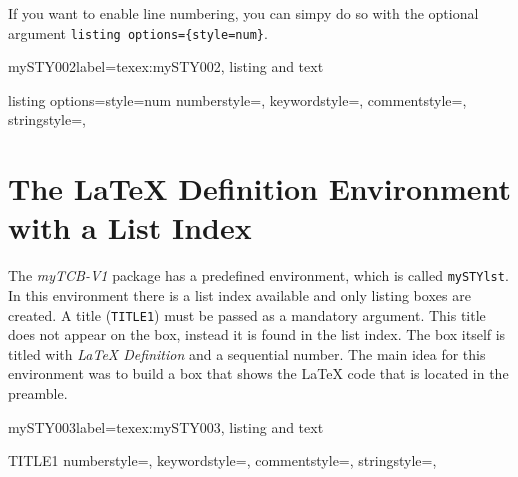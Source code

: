 \documentclass[]{myHOWTO-V001}
\begin{document}
If you want to enable line numbering, you can simpy do so with the optional argument \verb|listing options={style=num}|.

\begin{myTEXEXdoclst}{mySTY002}{label={texex:mySTY002}, listing and text}
\begin{mySTY}{listing options={style=num}}
{
	numberstyle={\scriptsize\ttfamily},
	keywordstyle={\scriptsize\ttfamily},
	commentstyle={\scriptsize\ttfamily},
	stringstyle={\scriptsize\ttfamily},
}
\end{mySTY}
\end{myTEXEXdoclst}

%
%

\section{The \LaTeX{} Definition Environment with a List Index}

The \emph{myTCB-V1} package has a predefined environment, which is called \Verb|mySTYlst|. In this environment there is a list index available and only listing boxes are created. A title (\verb|TITLE1|) must be passed as a mandatory argument. This title does not appear on the box, instead it is found in the list index. The box itself is titled with \emph{\LaTeX{} Definition} and a sequential number. The main idea for this environment was to build a box that shows the \LaTeX{} code that is located in the preamble.

\begin{myTEXEXdoclst}{mySTY003}{label={texex:mySTY003}, listing and text}
\begin{mySTYlst}{TITLE1}{}
{
	numberstyle={\scriptsize\ttfamily},
	keywordstyle={\scriptsize\ttfamily},
	commentstyle={\scriptsize\ttfamily},
	stringstyle={\scriptsize\ttfamily},
}
\end{mySTYlst}
\end{myTEXEXdoclst}
\end{document}
